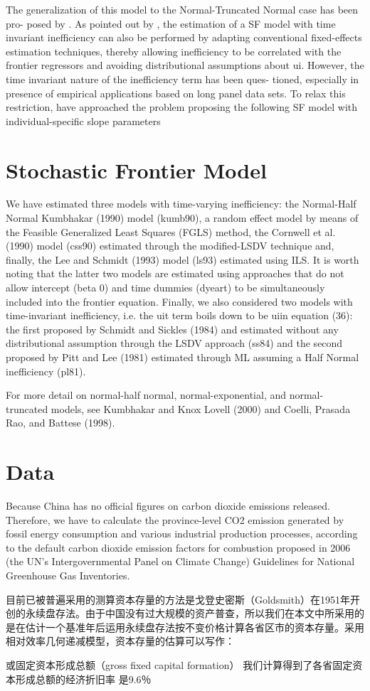 \documentclass[12pt]{article}
\begin{document}
The generalization of this model to the Normal-Truncated Normal case has been pro-
posed by \citet{battese1988prediction}. As pointed out by \citet{schmidt1984production}, the estimation of a SF model with time invariant inefficiency can also be performed by
adapting conventional fixed-effects estimation techniques, thereby allowing inefficiency
to be correlated with the frontier regressors and avoiding distributional assumptions
about ui. However, the time invariant nature of the inefficiency term has been ques-
tioned, especially in presence of empirical applications based on long panel data sets.
To relax this restriction, \citet{cornwell1990production} have approached the problem proposing
the following SF model with individual-specific slope parameters







\section{Stochastic Frontier Model}

We have estimated three models with time-varying inefficiency: the Normal-Half
Normal Kumbhakar (1990) model (kumb90), a random effect model by means of the
Feasible Generalized Least Squares (FGLS) method, the Cornwell et al. (1990) model
(css90) estimated through the modified-LSDV technique and, finally, the Lee and
Schmidt (1993) model (ls93) estimated using ILS. It is worth noting that the latter
two models are estimated using approaches that do not allow intercept (beta 0) and time
dummies (dyeart) to be simultaneously included into the frontier equation. Finally,
we also considered two models with time-invariant inefficiency, i.e. the uit term boils
down to be uiin equation (36): the first proposed by Schmidt and Sickles (1984) and
estimated without any distributional assumption through the LSDV approach (ss84)
and the second proposed by Pitt and Lee (1981) estimated through ML assuming a Half
Normal inefficiency (pl81).


For more detail on normal-half normal, normal-exponential, and normal-truncated models, see Kumbhakar and Knox Lovell (2000) and Coelli, Prasada Rao, and Battese (1998).

\section{Data}

Because China has no official figures on carbon dioxide emissions released. Therefore, we have to calculate the province-level CO2 emission generated by fossil energy consumption and various industrial production processes, according to the default carbon dioxide emission factors for combustion proposed in 2006 \citeauthor{change20062006} (the UN's Intergovernmental Panel on Climate Change) Guidelines for National Greenhouse Gas Inventories.

目前已被普遍采用的测算资本存量的方法是戈登史密斯（Goldsmith）在1951年开创的永续盘存法。由于中国没有过大规模的资产普查，所以我们在本文中所采用的是在估计一个基准年后运用永续盘存法按不变价格计算各省区市的资本存量。采用相对效率几何递减模型，资本存量的估算可以写作：

或固定资本形成总额（gross fixed capital formation）
我们计算得到了各省固定资本形成总额的经济折旧率 是9.6％






\end{document}
